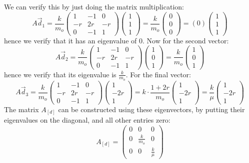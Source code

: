\documentclass{article}
\begin{document}
\begin{solution}
	We can verify this by just doing the matrix multiplication:
	\[
		A \vec d_1 = \frac{k}{m_o}\begin{pmatrix} 1 & -1 & 0 \\ -r & 2r & -r \\ 0 & -1 & 1 \end{pmatrix} 
		\begin{pmatrix} 1\\1\\1 \end{pmatrix} = \frac{k}{m_o}\begin{pmatrix} 0\\0\\0 \end{pmatrix} = 
		(0)\begin{pmatrix} 1\\1\\1 \end{pmatrix} 
	\] 
	hence we verify that it has an eigenvalue of 0. Now for the second vector:
	\[
		A\vec d_2 = \frac{k}{m_o}\begin{pmatrix} 1 & -1 & 0 \\ -r & 2r & -r\\0 & -1 & 1 \end{pmatrix} 
		\begin{pmatrix} 1 \\0 \\ 1 \end{pmatrix}  = \frac{k}{m_o}\begin{pmatrix} 1\\0\\1 \end{pmatrix} 
	\] 
	hence we verify that its eigenvalue is $\frac{k}{m_o}$. For the final vector:
	\[
		A\vec d_3 = \frac{k}{m_o}\begin{pmatrix} 1 & -1 & 0\\ -r & 2r & -r\\ 0 & -1 & 1 \end{pmatrix} 
		\begin{pmatrix} 1\\-2r\\1 \end{pmatrix} = k \cdot \frac{1 + 2r}{m_o}\begin{pmatrix} 1 \\-2r \\ 1 \end{pmatrix} = \frac{k}{\mu}\begin{pmatrix} 1\\-2r\\1 \end{pmatrix} 
	\] 
	The matrix $A_{[d]}$ can be constructed using these eigenvectors, by putting their eigenvalues on the 
	diagonal, and all other entries zero:
	\[
		A_{[d]} = \begin{pmatrix} 0 & 0 & 0\\ 0 & \frac{k}{m_o}& 0 \\ 0 & 0 & \frac{k}{\mu} \end{pmatrix} 
	\] 

\end{solution}
\end{document}
